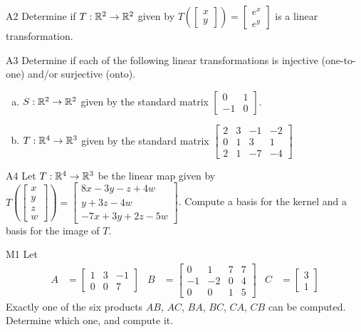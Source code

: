 \documentclass{sbgLAsemi}
\begin{document}
\begin{problem}{A2}
 Determine if $T: \mathbb{R}^2 \rightarrow \mathbb{R}^2$ given by $T\left(\begin{bmatrix} x \\ y \end{bmatrix}\right) = \begin{bmatrix} e^{x} \\ e^y \end{bmatrix}$ is a linear transformation.
\end{problem}

\begin{problem}{A3}
Determine if each of the following linear transformations is injective (one-to-one) and/or surjective (onto).
\begin{enumerate}[(a)]
\item $S: \mathbb{R}^2 \rightarrow \mathbb{R}^2$ given by the standard matrix $\begin{bmatrix} 0 & 1 \\ -1 & 0 \end{bmatrix}$.
\item $T: \mathbb{R}^4 \rightarrow \mathbb{R}^3$ given by the standard matrix $\begin{bmatrix} 2 & 3 & -1 & -2 \\ 0 & 1 & 3 & 1 \\ 2 & 1 & -7 & -4 \end{bmatrix}$
\end{enumerate}
\end{problem}

\begin{problem}{A4}
Let $T: \mathbb{R}^4 \rightarrow \mathbb{R}^3$ be the linear map given by $T\left(\begin{bmatrix} x \\ y \\ z \\ w \end{bmatrix} \right) = \begin{bmatrix}  8x-3y-z+4w \\ y+3z-4w \\ -7x+3y+2z-5w\end{bmatrix} $.
Compute a basis for the kernel and a basis for the image of $T$.
\end{problem}

\begin{problem}{M1}
Let
\begin{align*}
A &= \begin{bmatrix} 1 & 3 & -1  \\ 0 & 0 & 7  \end{bmatrix} & B &= \begin{bmatrix} 0 & 1 & 7 & 7 \\ -1 & -2 & 0 & 4 \\ 0 & 0 & 1 & 5 \end{bmatrix} & C&=\begin{bmatrix} 3  \\  1 \end{bmatrix}
\end{align*}
Exactly one of the six products $AB$, $AC$, $BA$, $BC$, $CA$, $CB$ can be computed.  Determine which one, and compute it.
\end{problem}
\end{document}
